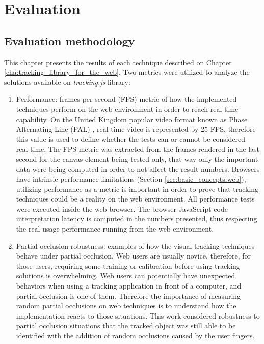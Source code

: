 \chapter{Evaluation} %
\label{cha:evaluation}

\section{Evaluation methodology} %
\label{sec:evaluation:evaluation_methodology}

This chapter presents the results of each technique described on Chapter \ref{cha:tracking_library_for_the_web}. Two metrics were utilized to analyze the solutions available on \textit{tracking.js} library:

\begin{enumerate}
	\item Performance: frames per second (FPS) metric of how the implemented techniques perform on the web environment in order to reach real-time capability. On the United Kingdom popular video format known as Phase Alternating Line (PAL) \cite{PAL1962}, real-time video is represented by 25 FPS, therefore this value is used to define whether the tests can or cannot be considered real-time. The FPS metric was extracted from the frames rendered in the last second for the canvas element being tested only, that way only the important data were being computed in order to not affect the result numbers. Browsers have intrinsic performance limitations (Section \ref{sec:basic_concepts:web}), utilizing performance as a metric is important in order to prove that tracking techniques could be a reality on the web environment. All performance tests were executed inside the web browser. The browser JavaScript code interpretation latency is computed in the numbers presented, thus respecting the real usage performance running from the web environment.
	\item Partial occlusion robustness: examples of how the visual tracking techniques behave under partial occlusion. Web users are usually novice, therefore, for those users, requiring some training or calibration before using tracking solutions is overwhelming. Web users can potentially have unexpected behaviors when using a tracking application in front of a computer, and partial occlusion is one of them. Therefore the importance of measuring random partial occlusions on web techniques is to understand how the implementation reacts to those situations. This work considered robustness to partial occlusion situations that the tracked object was still able to be identified with the addition of random occlusions caused by the user fingers.
\end{enumerate}


